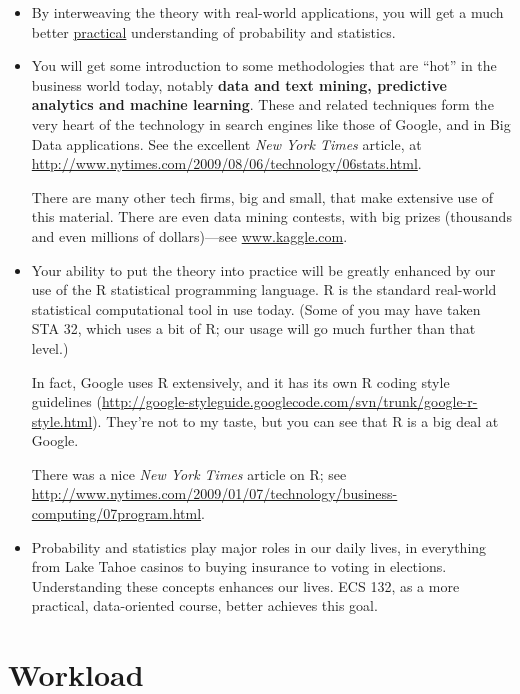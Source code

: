 \begin{itemize}

\item By interweaving the theory with real-world applications, you will
get a much better \underline{practical} understanding of probability
and statistics.

\item You will get some introduction to some methodologies that are
``hot'' in the business world today, notably {\bf data and text mining,
predictive analytics and machine learning}.  These and related
techniques form the very heart of the technology in search engines like
those of Google, and in Big Data applications.  See the excellent {\it
New York Times} article, at
\url{http://www.nytimes.com/2009/08/06/technology/06stats.html}.

There are many other tech firms, big and small, that make extensive use
of this material.  There are even data mining contests, with big prizes
(thousands and even millions of dollars)---see \url{www.kaggle.com}.

\item Your ability to put the theory into practice will be greatly
enhanced by our use of the R statistical programming language.  R is the
standard real-world statistical computational tool in use today.  (Some
of you may have taken STA 32, which uses a bit of R; our usage will go
much further than that level.)

In fact, Google uses R extensively, and it has its own R coding style
guidelines
(\url{http://google-styleguide.googlecode.com/svn/trunk/google-r-style.html}).
They're not to my taste, but you can see that R is a big deal at Google.

There was a nice {\it New York Times} article on R; see
\url{http://www.nytimes.com/2009/01/07/technology/business-computing/07program.html}.

\item Probability and statistics play major roles in our daily lives, in
everything from Lake Tahoe casinos to buying insurance to voting in
elections.  Understanding these concepts enhances our lives.  ECS 132,
as a more practical, data-oriented course, better achieves this goal.

\end{itemize}

\section{Workload}

